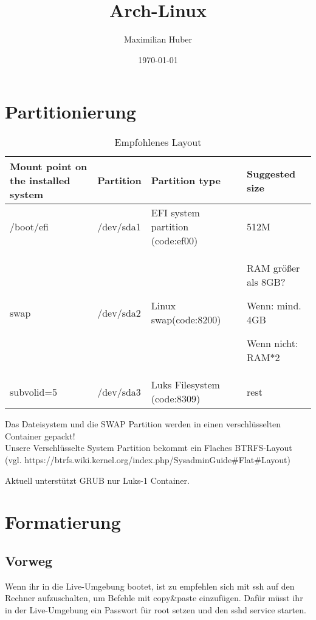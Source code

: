 \documentclass[11pt,a4paper]{article}
\author{Maximilian Huber}
\title{Arch-Linux}
\date{\today}
\begin{document}
\begin{titlepage}
\maketitle
\thispagestyle{empty}
\end{titlepage}

\tableofcontents
\thispagestyle{empty}	
\cleardoublepage
\setcounter{page}{1}

\section{Partitionierung}
\begin{table}[h]
\begin{tabular}{|p{3cm}|p{3cm}|p{3cm}| p{3cm} |}
\hline
Mount point on the installed system & Partition & Partition type   &  Suggested size \\ \hline
/boot/efi & /dev/sda1  & EFI system partition (code:ef00)  & 512M \\ \hline
swap & /dev/sda2  & Linux swap(code:8200)  & RAM größer als  8GB? 

Wenn: mind. 4GB  

Wenn nicht: RAM*2 \\ \hline
subvolid=5 & /dev/sda3  & Luks Filesystem (code:8309)  & rest  \\ \hline
\end{tabular}
\caption{Empfohlenes Layout}
\end{table}

Das Dateisystem und die SWAP Partition werden in einen verschlüsselten Container gepackt!\\

Unsere Verschlüsselte System Partition bekommt ein Flaches BTRFS-Layout (vgl. https://btrfs.wiki.kernel.org/index.php/SysadminGuide\#Flat\#Layout)


Aktuell unterstützt GRUB nur Luks-1 Container.
\section{Formatierung}
\subsection{Vorweg}
Wenn ihr in die Live-Umgebung bootet, ist zu empfehlen sich mit ssh auf den Rechner aufzuschalten, um Befehle mit copy\&paste einzufügen.
Dafür müsst ihr in der Live-Umgebung ein Passwort für root setzen und den sshd service starten.
\end{document}
